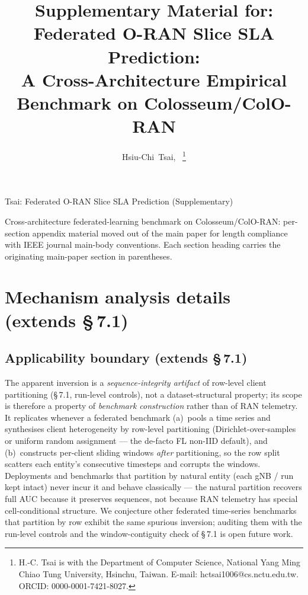 \documentclass[journal]{IEEEtran}
\begin{document}
\title{Supplementary Material for:\\
Federated O-RAN Slice SLA Prediction:\\
A Cross-Architecture Empirical Benchmark on Colosseum/ColO-RAN}

\author{%
    Hsiu-Chi~Tsai,~%
    \thanks{H.-C. Tsai is with the Department of Computer Science,
    National Yang Ming Chiao Tung University, Hsinchu, Taiwan.
    E-mail: hctsai1006@cs.nctu.edu.tw.
    ORCID: 0000-0001-7421-8027.}%
}

%
{Tsai: Federated O-RAN Slice SLA Prediction (Supplementary)}

\maketitle

Cross-architecture federated-learning benchmark on Colosseum/ColO-RAN: per-section appendix material moved out of the main paper for length compliance with IEEE journal main-body conventions. Each section heading carries the originating main-paper section in parentheses.


\appendices

\section{Mechanism analysis details (extends \S\,7.1)}\label{app:mechanism}

\subsection{Applicability boundary (extends \S\,7.1)}\label{app:applicability}

The apparent inversion is a \emph{sequence-integrity artifact} of row-level client partitioning (\S\,7.1, run-level controls), not a dataset-structural property; its scope is therefore a property of \emph{benchmark construction} rather than of RAN telemetry. It replicates whenever a federated benchmark (a)~pools a time series and synthesises client heterogeneity by row-level partitioning (Dirichlet-over-samples or uniform random assignment --- the de-facto FL non-IID default), and (b)~constructs per-client sliding windows \emph{after} partitioning, so the row split scatters each entity's consecutive timesteps and corrupts the windows. Deployments and benchmarks that partition by natural entity (each gNB / run kept intact) never incur it and behave classically --- the natural partition recovers full AUC because it preserves sequences, not because RAN telemetry has special cell-conditional structure. We conjecture other federated time-series benchmarks that partition by row exhibit the same spurious inversion; auditing them with the run-level controls and the window-contiguity check of \S\,7.1 is open future work.
\end{document}
